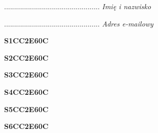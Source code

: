 \begin{turn}{90}\begin{minipage}{\linewidth} \vspace{20mm} ................................................  \textit{Imię i nazwisko}\end{minipage}\end{turn}

\begin{turn}{90}\begin{minipage}{\linewidth} \vspace{20mm} ................................................  \textit{Adres e-mailowy}\end{minipage}\end{turn}

\begin{turn}{90}\huge \begin{minipage}{\linewidth} \vspace{10mm}\textbf{S1CC2E60C}\end{minipage}\end{turn}

\begin{turn}{90}\huge \begin{minipage}{\linewidth} \vspace{10mm}\textbf{S2CC2E60C}\end{minipage}\end{turn}

\begin{turn}{90}\huge \begin{minipage}{\linewidth} \vspace{10mm}\textbf{S3CC2E60C}\end{minipage}\end{turn}

\begin{turn}{90}\huge \begin{minipage}{\linewidth} \vspace{10mm}\textbf{S4CC2E60C}\end{minipage}\end{turn}

\begin{turn}{90}\huge \begin{minipage}{\linewidth} \vspace{10mm}\textbf{S5CC2E60C}\end{minipage}\end{turn}

\begin{turn}{90}\huge \begin{minipage}{\linewidth} \vspace{10mm}\textbf{S6CC2E60C}\end{minipage}\end{turn}

